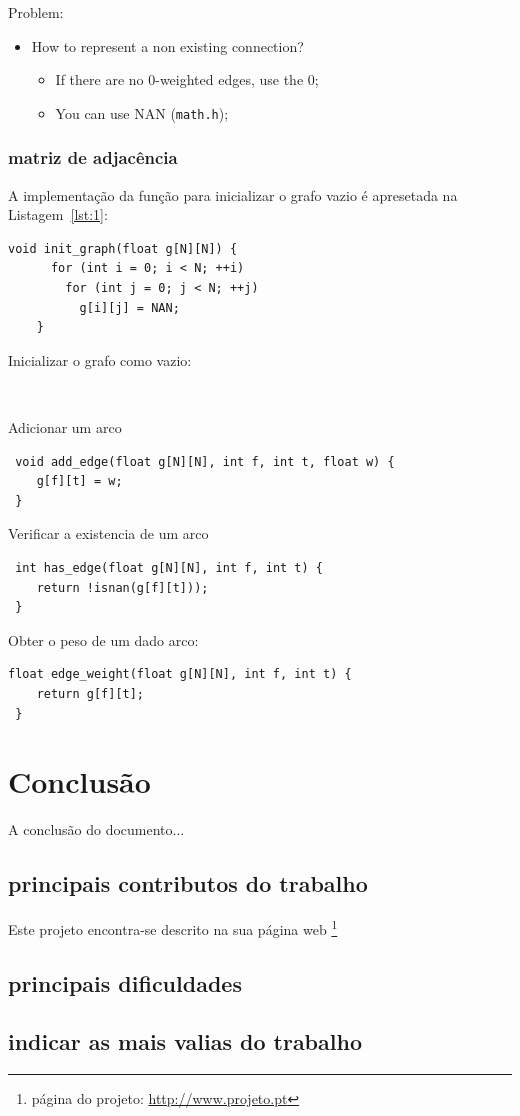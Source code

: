 \documentclass[a4wide]{report}
\begin{document}
Problem:
\begin{itemize}
\item How to represent a non existing connection?
  \begin{itemize}
  \item If there are no 0-weighted edges, use the 0;
  \item You can use NAN (\verb!math.h!);
  \end{itemize}
\end{itemize}

\subsection{matriz de adjacência}  

A implementação da função para inicializar o grafo vazio é apresetada na Listagem~\ref{lst:1}: 
\begin{lstlisting}[caption={inicializar o grafo vazio},
                   label=lst:1]
   void init_graph(float g[N][N]) {
      for (int i = 0; i < N; ++i)
        for (int j = 0; j < N; ++j)
          g[i][j] = NAN;
    }
\end{lstlisting}

Inicializar o grafo como vazio:

  \begin{lstlisting}
    
  \end{lstlisting}

Adicionar um arco

  \begin{lstlisting}
 void add_edge(float g[N][N], int f, int t, float w) {
    g[f][t] = w;
 }
  \end{lstlisting}
Verificar a existencia de um arco
  \begin{lstlisting}
 int has_edge(float g[N][N], int f, int t) {
    return !isnan(g[f][t]));
 }
  \end{lstlisting}
  
Obter o peso de um dado arco:
    \begin{lstlisting}
float edge_weight(float g[N][N], int f, int t) {
    return g[f][t];
 }
  \end{lstlisting}




\chapter{Conclusão} 
\label{cap:conclusao} %
A conclusão do documento...

\section{principais contributos do trabalho}
Este projeto encontra-se descrito na sua página web 
\footnote{página do projeto: \url{http://www.projeto.pt}}

\section{principais dificuldades}

\section{indicar as mais valias do trabalho}
\end{document}
